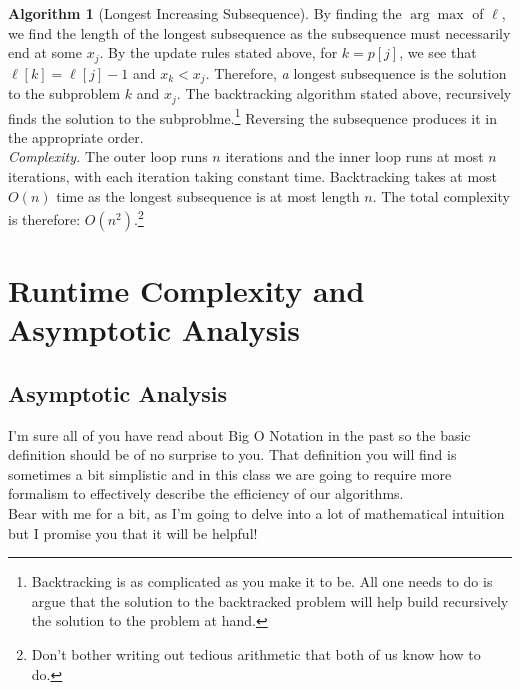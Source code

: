 \documentclass[11pt]{article}
\theoremstyle{plain}
\theoremstyle{definition}
\newtheorem{alg}[thm]{Algorithm}
\numberwithin{equation}{section}
\numberwithin{figure}{section}
\begin{document}
\begin{alg}[Longest Increasing Subsequence]
\noindent By finding the $\arg \max$ of $\ell$, we find the length of the longest subsequence as the subsequence must necessarily end at some $x_j$. By the update rules stated above, for $k = p[j]$, we see that $\ell[k] = \ell[j] - 1$ and $x_k < x_j$. Therefore, \emph{a} longest subsequence is the solution to the subproblem $k$ and $x_j$. The backtracking algorithm stated above, recursively finds the solution to the subproblme.\footnote{Backtracking is as complicated as you make it to be. All one needs to do is argue that the solution to the backtracked problem will help build recursively the solution to the problem at hand.} Reversing the subsequence produces it in the appropriate order. \\

\noindent \textit{Complexity.} The outer loop runs $n$ iterations and the inner loop runs at most $n$ iterations, with each iteration taking constant time. Backtracking takes at most $O(n)$ time as the longest subsequence is at most length $n$. The total complexity is therefore: $O(n^2)$.\footnote{Don't bother writing out tedious arithmetic that both of us know how to do.}

\end{alg}






\newpage
\section{Runtime Complexity and Asymptotic Analysis}
\subsection{Asymptotic Analysis}
I'm sure all of you have read about Big O Notation in the past so the basic definition should be of no surprise to you. That definition you will find is sometimes a bit simplistic and in this class we are going to require more formalism to effectively describe the efficiency of our algorithms. \\

\noindent Bear with me for a bit, as I'm going to delve into a lot of mathematical intuition but I promise you that it will be helpful! \\
\end{document}
